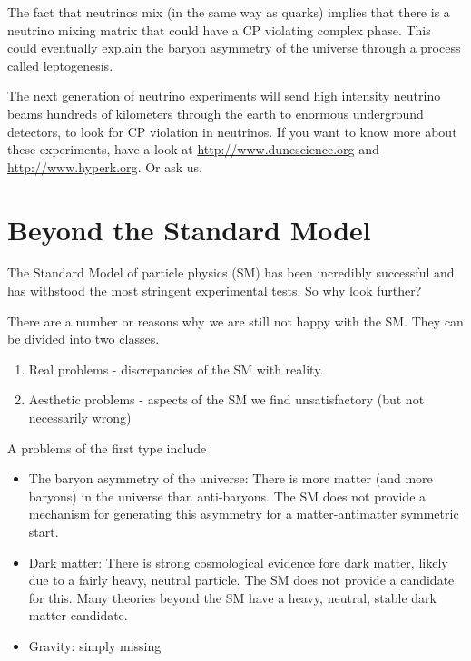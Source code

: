 The fact that neutrinos mix (in the same way as quarks) implies that there is a neutrino mixing matrix that could have a CP violating complex phase. This could eventually explain the baryon asymmetry of the universe through a process called leptogenesis.

The next generation of neutrino experiments will send high intensity neutrino beams hundreds of kilometers through the earth to enormous underground detectors, to look for CP violation in neutrinos. If you want to know more about these experiments, have a look at \href{http://www.dunescience.org/}{http://www.dunescience.org} and 
\href{http://www.hyperk.org/}{http://www.hyperk.org}. Or ask us.

\section{Beyond the Standard Model}
The Standard Model of particle physics (SM) has been incredibly successful and has withstood the most stringent experimental tests. So why look further?

There are a number or reasons why we are still not happy with the SM. They can be divided into two classes.
\begin{enumerate}
\item Real problems - discrepancies of the SM with reality.
\item Aesthetic problems - aspects of the SM we find unsatisfactory (but not necessarily wrong)
\end{enumerate}

A problems of the first type include
\begin{itemize}
\item The baryon asymmetry of the universe: There is more matter (and more baryons) in the universe than anti-baryons. The SM does not provide a mechanism for generating this asymmetry for a matter-antimatter symmetric start.
\item Dark matter: There is strong cosmological evidence fore dark matter, likely due to a fairly heavy, neutral particle. The SM does not provide a candidate for this. Many theories beyond the SM have a heavy, neutral, stable dark matter candidate.
\item Gravity: simply missing
\end{itemize}

